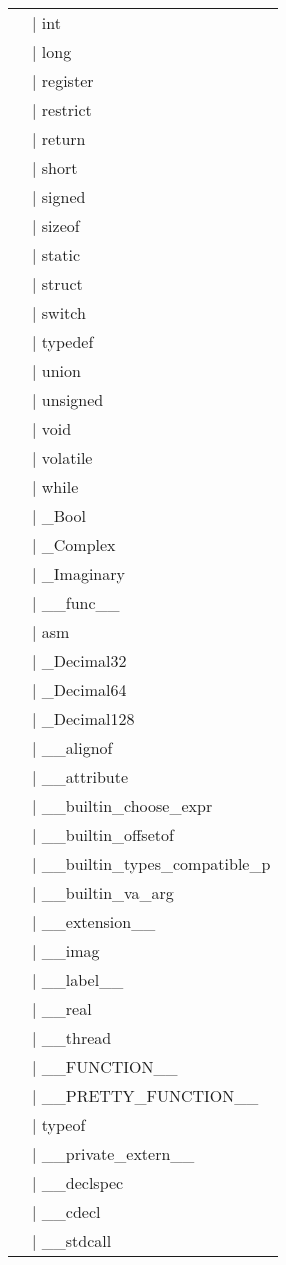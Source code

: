 \documentclass[a4paper]{article}
\begin{document}
\begin{tabular}{ll}
&$\mid$ int\\
&$\mid$ long\\
&$\mid$ register\\
&$\mid$ restrict\\
&$\mid$ return\\
&$\mid$ short\\
&$\mid$ signed\\
&$\mid$ sizeof\\
&$\mid$ static\\
&$\mid$ struct\\
&$\mid$ switch\\
&$\mid$ typedef\\
&$\mid$ union\\
&$\mid$ unsigned\\
&$\mid$ void\\
&$\mid$ volatile\\
&$\mid$ while\\
&$\mid$ \_Bool\\
&$\mid$ \_Complex\\
&$\mid$ \_Imaginary\\
&$\mid$ \_\_func\_\_\\
&$\mid$ asm\\
&$\mid$ \_Decimal32\\
&$\mid$ \_Decimal64\\
&$\mid$ \_Decimal128\\
&$\mid$ \_\_alignof\\
&$\mid$ \_\_attribute\\
&$\mid$ \_\_builtin\_choose\_expr\\
&$\mid$ \_\_builtin\_offsetof\\
&$\mid$ \_\_builtin\_types\_compatible\_p\\
&$\mid$ \_\_builtin\_va\_arg\\
&$\mid$ \_\_extension\_\_\\
&$\mid$ \_\_imag\\
&$\mid$ \_\_label\_\_\\
&$\mid$ \_\_real\\
&$\mid$ \_\_thread\\
&$\mid$ \_\_FUNCTION\_\_\\
&$\mid$ \_\_PRETTY\_FUNCTION\_\_\\
&$\mid$ typeof\\
&$\mid$ \_\_private\_extern\_\_\\
&$\mid$ \_\_declspec\\
&$\mid$ \_\_cdecl\\
&$\mid$ \_\_stdcall\\

\end{tabular}
\end{document}
